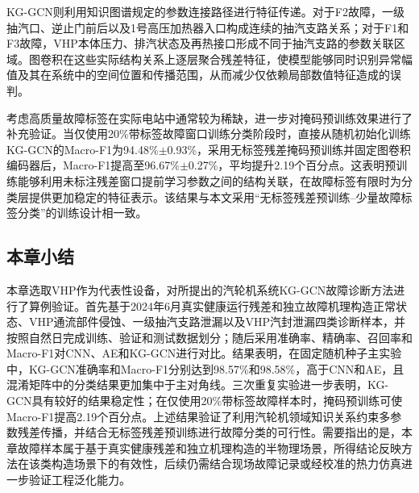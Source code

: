 KG-GCN则利用知识图谱规定的参数连接路径进行特征传递。对于F2故障，一级抽汽口、逆止门前后以及1号高压加热器入口构成连续的抽汽支路关系；对于F1和F3故障，VHP本体压力、排汽状态及再热接口形成不同于抽汽支路的参数关联区域。图卷积在这些实际结构关系上逐层聚合残差特征，使模型能够同时识别异常幅值及其在系统中的空间位置和传播范围，从而减少仅依赖局部数值特征造成的误判。

考虑高质量故障标签在实际电站中通常较为稀缺，进一步对掩码预训练效果进行了补充验证。当仅使用20\%带标签故障窗口训练分类阶段时，直接从随机初始化训练KG-GCN的Macro-F1为94.48\%$\pm$0.93\%，采用无标签残差掩码预训练并固定图卷积编码器后，Macro-F1提高至96.67\%$\pm$0.27\%，平均提升2.19个百分点。这表明预训练能够利用未标注残差窗口提前学习参数之间的结构关联，在故障标签有限时为分类层提供更加稳定的特征表示。该结果与本文采用“无标签残差预训练--少量故障标签分类”的训练设计相一致。

\subsection{本章小结}

本章选取VHP作为代表性设备，对所提出的汽轮机系统KG-GCN故障诊断方法进行了算例验证。首先基于2024年6月真实健康运行残差和独立故障机理构造正常状态、VHP通流部件侵蚀、一级抽汽支路泄漏以及VHP汽封泄漏四类诊断样本，并按照自然日完成训练、验证和测试数据划分；随后采用准确率、精确率、召回率和Macro-F1对CNN、AE和KG-GCN进行对比。结果表明，在固定随机种子主实验中，KG-GCN准确率和Macro-F1分别达到98.57\%和98.58\%，高于CNN和AE，且混淆矩阵中的分类结果更加集中于主对角线。三次重复实验进一步表明，KG-GCN具有较好的结果稳定性；在仅使用20\%带标签故障样本时，掩码预训练可使Macro-F1提高2.19个百分点。上述结果验证了利用汽轮机领域知识关系约束多参数残差传播，并结合无标签残差预训练进行故障分类的可行性。需要指出的是，本章故障样本属于基于真实健康残差和独立机理构造的半物理场景，所得结论反映方法在该类构造场景下的有效性，后续仍需结合现场故障记录或经校准的热力仿真进一步验证工程泛化能力。
